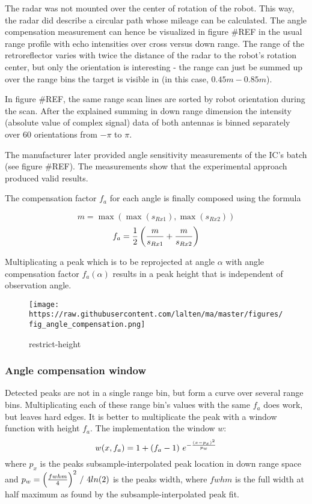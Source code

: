 The radar was not mounted over the center of rotation of the robot. This
way, the radar did describe a circular path whose mileage can be
calculated. The angle compensation measurement can hence be visualized
in figure \#REF in the usual range profile with echo intensities over
cross versus down range. The range of the retroreflector varies with
twice the distance of the radar to the robot's rotation center, but only
the orientation is interesting - the range can just be summed up over
the range bins the target is visible in (in this case,
\(0.45m - 0.85m\)).

In figure \#REF, the same range scan lines are sorted by robot
orientation during the scan. After the explained summing in down range
dimension the intensity (absolute value of complex signal) data of both
antennas is binned separately over 60 orientations from \(-\pi\) to
\(\pi\).

The manufacturer later provided angle sensitivity measurements of the
IC's batch (see figure \#REF). The measurements show that the
experimental approach produced valid results.

The compensation factor \(f_a\) for each angle is finally composed using
the formula

\[m = \max \left( \max (s_{Rx1}), \max (s_{Rx2}) \right)\] \[
f_a = {1\over{2}}
  \left(
    {{m}\over{ s_{Rx1} }} +
    {{m}\over{ s_{Rx2} }}
  \right)
\]

Multiplicating a peak which is to be reprojected at angle \(\alpha\)
with angle compensation factor \(f_a(\alpha)\) results in a peak height
that is independent of observation angle.

\begin{figure}
\centering
\texttt{[image: https://raw.githubusercontent.com/lalten/ma/master/figures/fig\_angle\_compensation.png]}
\caption{restrict-height}
\end{figure}

\subsubsection{Angle compensation
window}\label{angle-compensation-window}

Detected peaks are not in a single range bin, but form a curve over
several range bins. Multiplicating each of these range bin's values with
the same \(f_a\) does work, but leaves hard edges. It is better to
multiplicate the peak with a window function with height \(f_a\). The
implementation the window \(w\): \[
w(x,f_a) = 1 + (f_a - 1)
~e ^ {
 -{
    \left( {x - p_x} \right) ^ 2
    \over{ {p_w} }
  }
}
\] where \(p_x\) is the peaks subsample-interpolated peak location in
down range space and
\(p_w = { {{ \left( { {fwhm}\over{4} } \right) } ^2}~/~{4 ln(2)} }\) is
the peaks width, where \(fwhm\) is the full width at half maximum as
found by the subsample-interpolated peak fit.

